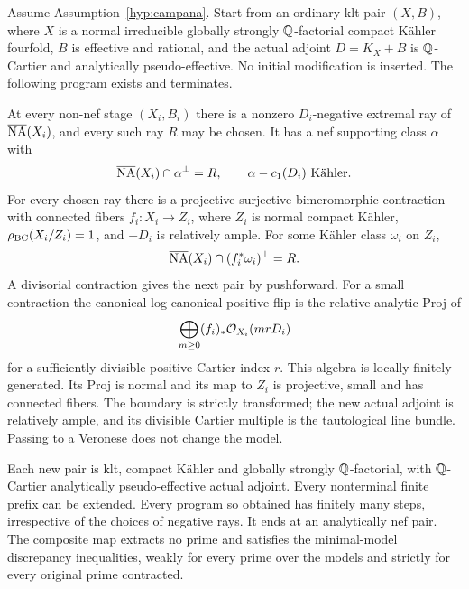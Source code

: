 \begin{assumption}
\label{hyp:mmp}
Assume Assumption~\ref{hyp:campana}. Start from an ordinary klt pair
\((X,B)\), where \(X\) is a normal irreducible globally strongly
\(\mathbb{Q}\)-factorial compact K\"ahler fourfold, \(B\) is effective
and rational, and the actual adjoint \(D=K_X+B\) is
\(\mathbb{Q}\)-Cartier and analytically pseudo-effective. No initial
modification is inserted. The following program exists and
terminates.

At every non-nef stage \((X_i,B_i)\) there is a nonzero
\(D_i\)-negative extremal ray of \(\overline{\mathrm{NA}}(X_i)\), and every such
ray \(R\) may be chosen. It has a nef supporting class \(\alpha\)
with
\[
 \overline{\mathrm{NA}}(X_i)\cap\alpha^\perp=R,
 \qquad \alpha-c_1(D_i)\text{ K\"ahler}.
\]
For every chosen ray there is a projective surjective bimeromorphic
contraction with connected fibers
\(f_i:X_i\to Z_i\), where \(Z_i\) is normal compact K\"ahler,
\(\rho_{\mathrm{BC}}(X_i/Z_i)=1\), and \(-D_i\) is relatively ample.
For some K\"ahler class \(\omega_i\) on \(Z_i\),
\[
 \overline{\mathrm{NA}}(X_i)\cap(f_i^*\omega_i)^\perp=R.
\]
A divisorial contraction gives the next pair by pushforward. For a
small contraction the canonical log-canonical-positive flip is the
relative analytic Proj of
\[
 \bigoplus_{m\ge0}(f_i)_*\mathcal{O}_{X_i}(mrD_i)
\]
for a sufficiently divisible positive Cartier index \(r\). This
algebra is locally finitely generated. Its Proj is normal and its
map to \(Z_i\) is projective, small and has connected fibers. The
boundary is strictly transformed; the new actual adjoint is
relatively ample, and its divisible Cartier multiple is the
tautological line bundle. Passing to a Veronese does not change the
model.

Each new pair is klt, compact K\"ahler and globally strongly
\(\mathbb{Q}\)-factorial, with \(\mathbb{Q}\)-Cartier analytically
pseudo-effective actual adjoint. Every nonterminal finite prefix
can be extended. Every program so obtained has finitely many steps,
irrespective of the choices of negative rays. It ends at an
analytically nef pair. The composite map extracts no prime and
satisfies the minimal-model discrepancy inequalities, weakly for
every prime over the models and strictly for every original prime
contracted.
\end{assumption}

